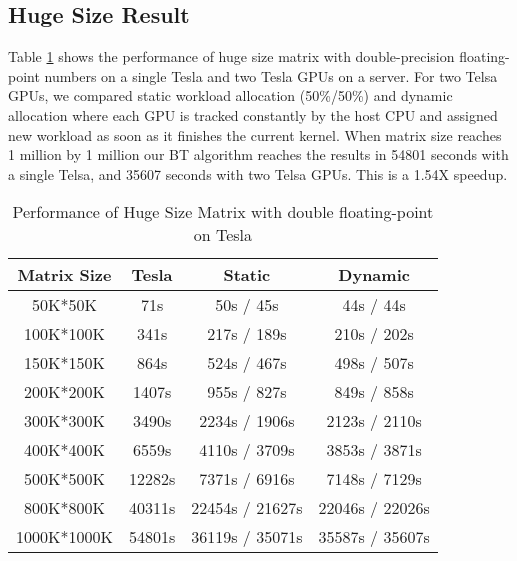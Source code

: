 \subsection{Huge Size Result}
Table \ref{tab:hugeResultTesla} shows the performance of huge size matrix with double-precision floating-point numbers on a single Tesla and two Tesla GPUs on a server. For two Telsa GPUs, we compared static workload allocation (50\%/50\%) and dynamic allocation where each GPU is tracked constantly by the host CPU and assigned new workload as soon as it finishes the current kernel. 
When matrix size reaches 1 million by 1 million our BT algorithm reaches the results in 54801 seconds with a single Telsa, and 35607 seconds with two Telsa GPUs. This is a 1.54X speedup.
\begin{table}[h]
\vspace{-0.3in}
\caption{Performance of Huge Size Matrix with double floating-point on Tesla}
\vspace{-0.1in}
\centering
\begin{tabular}{|c|c|c|c|}
\hline
Matrix Size &  Tesla  & Static & Dynamic \\ \hline
 50K*50K    &    71s  &   50s /  45s &  44s / 44s \\ \hline
 100K*100K  &   341s  &  217s / 189s &  210s / 202s \\ \hline
 150K*150K  &   864s  &  524s / 467s &  498s / 507s \\ \hline
 200K*200K  &  1407s  &  955s / 827s &  849s / 858s \\ \hline
 300K*300K  &  3490s  & 2234s / 1906s & 2123s / 2110s\\ \hline
 400K*400K  &  6559s  & 4110s / 3709s & 3853s / 3871s\\ \hline
 500K*500K  & 12282s  & 7371s / 6916s  & 7148s / 7129s\\ \hline
 800K*800K  & 40311s  & 22454s / 21627s &  22046s / 22026s   \\ \hline
 1000K*1000K & 54801s  & 36119s / 35071s   &  35587s / 35607s \\ \hline
\end{tabular}
\label{tab:hugeResultTesla}
\vspace{-0.2in}
\end{table}

